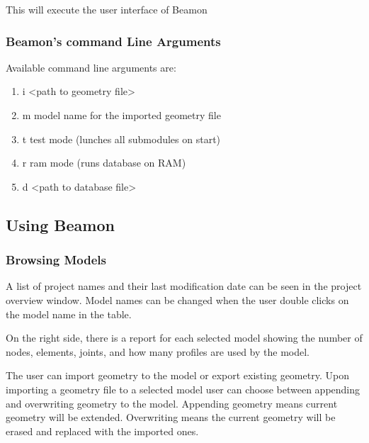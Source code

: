 \documentclass[letterpaper,10pt,english]{sphinxmanual}
\begin{document}
This will execute the user interface of Beamon


\subsubsection{Beamon’s command Line Arguments}
\label{\detokenize{getting_started:beamon-s-command-line-arguments}}
Available command line arguments are:
\begin{enumerate}
%
\item {} 
\sphinxhyphen{}i \textless{}path to geometry file\textgreater{}

\item {} 
\sphinxhyphen{}m model name for the imported geometry file

\item {} 
\sphinxhyphen{}t test mode (lunches all submodules on start)

\item {} 
\sphinxhyphen{}r ram mode (runs database on RAM)

\item {} 
\sphinxhyphen{}d \textless{}path to database file\textgreater{}

\end{enumerate}


\subsection{Using Beamon}
\label{\detokenize{getting_started:using-beamon}}

\subsubsection{Browsing Models}
\label{\detokenize{getting_started:browsing-models}}
A list of project names and their last modification date can be seen in the project overview window.
Model names can be changed when the user double clicks on the model name in the table.

On the right side, there is a report for each selected model showing the number of nodes, elements,  joints,
and how many profiles are used by the model.

The user can import geometry to the model or export existing geometry. Upon importing a geometry file to a
selected model user can choose between appending and overwriting geometry to the model.
Appending geometry means current geometry will be extended.
Overwriting means the current geometry will be erased and replaced with the imported ones.
\end{document}

